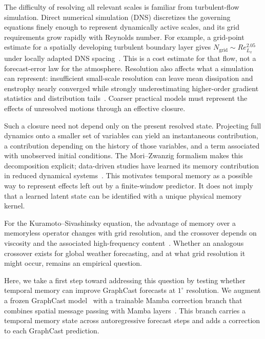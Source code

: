 The difficulty of resolving all relevant scales is familiar from turbulent-flow simulation. Direct numerical simulation (DNS) discretizes the governing equations finely enough to represent dynamically active scales, and its grid requirements grow rapidly with Reynolds number. For example, a grid-point estimate for a spatially developing turbulent boundary layer gives $N_{\mathrm{grid}}\sim Re_{L_x}^{2.05}$ under locally adapted DNS spacing~\cite{yang2021grid}. This is a cost estimate for that flow, not a forecast-error law for the atmosphere. Resolution also affects what a simulation can represent: insufficient small-scale resolution can leave mean dissipation and enstrophy nearly converged while strongly underestimating higher-order gradient statistics and distribution tails~\cite{DonzisResolutionEffects}. Coarser practical models must represent the effects of unresolved motions through an effective closure.

Such a closure need not depend only on the present resolved state. Projecting full dynamics onto a smaller set of variables can yield an instantaneous contribution, a contribution depending on the history of those variables, and a term associated with unobserved initial conditions. The Mori--Zwanzig formalism makes this decomposition explicit; data-driven studies have learned its memory contribution in reduced dynamical systems~\cite{YenTingLinMZ2021,de2026data}. This motivates temporal memory as a possible way to represent effects left out by a finite-window predictor. It does not imply that a learned latent state can be identified with a unique physical memory kernel.

For the Kuramoto--Sivashinsky equation, the advantage of memory over a memoryless operator changes with grid resolution, and the crossover depends on viscosity and the associated high-frequency content~\cite{buitrago2025memory}. Whether an analogous crossover exists for global weather forecasting, and at what grid resolution it might occur, remains an empirical question.

Here, we take a first step toward addressing this question by testing whether temporal memory can improve GraphCast forecasts at $1^\circ$ resolution. We augment a frozen GraphCast model~\cite{lam2023graphcast} with a trainable Mamba correction branch that combines spatial message passing with Mamba layers~\cite{gu2023mamba}. This branch carries a temporal memory state across autoregressive forecast steps and adds a correction to each GraphCast prediction.

